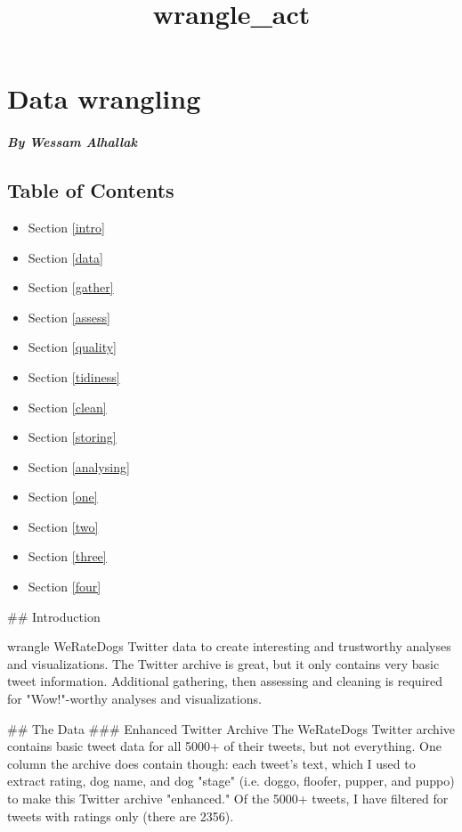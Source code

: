 \documentclass[11pt]{article}
\title{wrangle\_act}
\providecommand{\tightlist}{%
      \setlength{\itemsep}{0pt}\setlength{\parskip}{0pt}}
\begin{document}
    
    
    \maketitle
    
    

    
    \section{Data wrangling}\label{data-wrangling}

\subparagraph{By Wessam Alhallak}\label{by-wessam-alhallak}

    \subsection{Table of Contents}\label{table-of-contents}

\begin{itemize}
\tightlist
\item
  Section \ref{intro}
\item
  Section \ref{data}
\item
  Section \ref{gather}
\item
  Section \ref{assess}
\item
  Section \ref{quality}
\item
  Section \ref{tidiness}
\item
  Section \ref{clean}
\item
  Section \ref{storing}
\item
  Section \ref{analysing}
\item
  Section \ref{one}
\item
  Section \ref{two}
\item
  Section \ref{three}
\item
  Section \ref{four}
\end{itemize}

     \#\# Introduction

wrangle WeRateDogs Twitter data to create interesting and trustworthy
analyses and visualizations. The Twitter archive is great, but it only
contains very basic tweet information. Additional gathering, then
assessing and cleaning is required for "Wow!"-worthy analyses and
visualizations.

     \#\# The Data \#\#\# Enhanced Twitter Archive The WeRateDogs Twitter
archive contains basic tweet data for all 5000+ of their tweets, but not
everything. One column the archive does contain though: each tweet's
text, which I used to extract rating, dog name, and dog "stage" (i.e.
doggo, floofer, pupper, and puppo) to make this Twitter archive
"enhanced." Of the 5000+ tweets, I have filtered for tweets with ratings
only (there are 2356).
\end{document}
